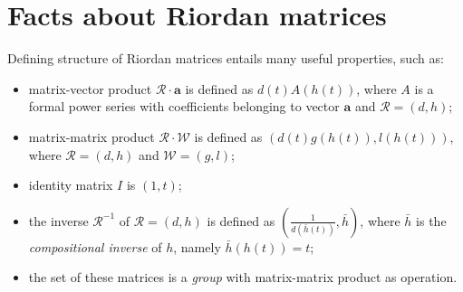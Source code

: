 \section*{Facts about Riordan matrices}

Defining structure of Riordan matrices entails many useful properties, such as:
\begin{itemize} 
\item matrix-vector product $\mathcal{R}\cdot \textbf{a}$ is defined as 
    $ d(t)A(h(t))$, where $A$ is a formal power series
    with coefficients belonging to vector $\textbf{a}$ and $\mathcal{R}=(d, h)$;
\item matrix-matrix product $\mathcal{R}\cdot \mathcal{W}$ is defined as 
    $(d(t)g(h(t)), l(h(t)))$, where $\mathcal{R}=(d, h)$ and $\mathcal{W}=(g, l)$;
\item identity matrix $I$ is $(1, t)$;
\item the inverse $\mathcal{R}^{-1}$ of $\mathcal{R}=(d, h)$ is defined as 
    $\left(\frac{1}{d(\bar{h}(t))}, \bar{h}\right)$, where $\bar{h}$ is the \emph{compositional inverse} 
    of $h$, namely $\bar{h}(h(t))=t$;
\item the set of these matrices is a \emph{group} with matrix-matrix product as operation.    
\end{itemize}

